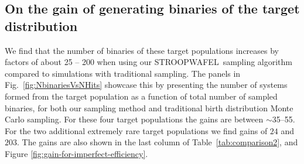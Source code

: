 \documentclass[a4paper,fleqn,usenatbib,useAMS,usedcolumn]{mnras}
\newcommand{\AISs}{\textsc{STROOPWAFEL}}
\begin{document}
\subsection{On the gain of generating binaries of the target distribution}
\label{subsec:VerificationCOMPASefficiency}
%

%
We find that the number of binaries of these target populations increases by factors of about 25 -- 200 when using our \AISs \ sampling algorithm compared to simulations with traditional sampling. 
The panels in Fig.~\ref{fig:NbinariesVsNHits}  showcase this by presenting the number of systems formed from the target population as a function of total number of sampled binaries, for both our sampling method and traditional birth distribution Monte Carlo sampling. For these four target populations the gains are between $\sim$35--55.  For the two additional extremely rare target populations we find gains of $24$ and $203$. The gains are also shown  in the last column of Table~\ref{tab:comparison2}, and Figure \ref{fig:gain-for-imperfect-efficiency}. 
\end{document}
